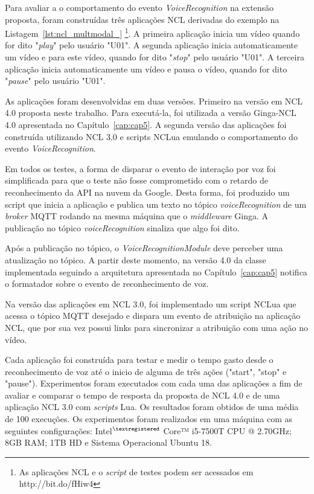 Para avaliar a o comportamento do evento \textit{VoiceRecognition} na extensão proposta, foram construídas três aplicações NCL derivadas do exemplo na Listagem~\ref{lst:ncl_multmodal_} \footnote{As aplicações NCL e o \textit{script} de testes podem ser acessados em http://bit.do/fHiw4}. A primeira aplicação inicia um vídeo quando for dito "\textit{play}" pelo usuário "U01". A segunda aplicação inicia automaticamente um vídeo e para este vídeo, quando for dito "\textit{stop}" pelo usuário "U01". A terceira aplicação inicia automaticamente um vídeo e pausa o vídeo, quando for dito "\textit{pause}" pelo usuário "U01". 

As aplicações foram desenvolvidas em duas versões. Primeiro na versão em NCL 4.0 proposta neste trabalho. Para executá-la, foi utilizada a versão Ginga-NCL 4.0 apresentada no Capítulo~\ref{cap:cap5}. A segunda versão das aplicações foi construída utilizando NCL 3.0 e scripts NCLua emulando o comportamento do evento \textit{VoiceRecognition}.

Em todos os testes, a forma de disparar o evento de interação por voz foi simplificada para que o teste não fosse comprometido com o retardo de reconhecimento da API na nuvem da Google. Desta forma, foi produzido um script que inicia a aplicação e publica um texto no tópico \textit{voiceRecognition} de um \textit{broker} MQTT rodando na mesma máquina que o \textit{middleware} Ginga. A publicação no tópico \textit{voiceRecognition} sinaliza que algo foi dito.

Após a publicação no tópico, o \textit{VoiceRecognitionModule} deve perceber uma atualização no tópico. A partir deste momento, na versão 4.0 da classe implementada seguindo a arquitetura apresentada no Capítulo~\ref{cap:cap5} notifica o formatador sobre o evento de reconhecimento de voz. 

Na versão das aplicações em NCL 3.0, foi implementado um script NCLua que acessa o tópico MQTT desejado e dispara um evento de atribuição na aplicação NCL, que por sua vez possui links para sincronizar a atribuição com uma ação no vídeo.

Cada aplicação foi construída para testar e medir o tempo gasto desde o reconhecimento de voz até o inicio de alguma de três ações ("start", "stop" e "pause"). Experimentos foram executados com cada uma das aplicações a fim de avaliar e comparar o tempo de resposta da proposta de NCL 4.0 e de uma aplicação NCL 3.0 com \textit{scripts} Lua. Os resultados foram obtidos de uma média de 100 execuções. Os experimentos foram realizados em uma máquina com as seguintes configurações: Intel$^{\tiny{\textregistered}}$ Core™ i5-7500T CPU @ 2.70GHz; 8GB RAM; 1TB HD e Sistema Operacional Ubuntu 18.

